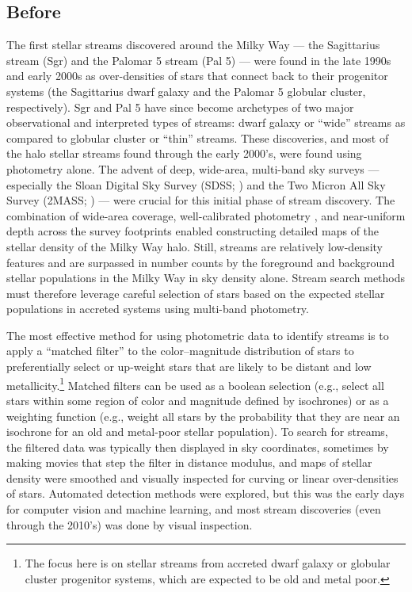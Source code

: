\documentclass[final,5p,times,twocolumn,authoryear]{elsarticle}
\begin{document}

\subsection{Before \gaia}

The first stellar streams discovered around the Milky Way --- the Sagittarius stream
(Sgr) and the Palomar 5 stream (Pal 5) --- were found in the late 1990s and early 2000s
as over-densities of stars that connect back to their progenitor systems (the
Sagittarius dwarf galaxy and the Palomar 5 globular cluster, respectively).
Sgr and Pal 5 have since become archetypes of two major observational and interpreted
types of streams: dwarf galaxy or ``wide'' streams as compared to globular cluster or
``thin'' streams.
These discoveries, and most of the halo stellar streams found through the early 2000's,
were found using photometry alone.
The advent of deep, wide-area, multi-band sky surveys --- especially the Sloan Digital
Sky Survey (SDSS; \citealt{york:2000, gunn:1998, fukugita:1996}) and the Two Micron All
Sky Survey (2MASS; \citealt{skrutskie:2006}) --- were crucial for this initial phase of
stream discovery.
The combination of wide-area coverage, well-calibrated photometry
\citep{padmanabhan:2008}, and near-uniform depth across the survey footprints enabled
constructing detailed maps of the stellar density of the Milky Way halo.
Still, streams are relatively low-density features and are surpassed in number counts by
the foreground and background stellar populations in the Milky Way in sky density alone.
Stream search methods must therefore leverage careful selection of stars based on the
expected stellar populations in accreted systems using multi-band photometry.

The most effective method for using photometric data to identify streams is to apply a
``matched filter'' \citep{rockosi:2002} to the color--magnitude distribution of stars
to preferentially select or up-weight stars that are likely to be distant and low
metallicity.\footnote{The focus here is on stellar streams from accreted dwarf galaxy or
globular cluster progenitor systems, which are expected to be old and metal poor.}
Matched filters can be used as a boolean selection (e.g., select all stars within some
region of color and magnitude defined by isochrones) or as a weighting function (e.g.,
weight all stars by the probability that they are near an isochrone for an old and
metal-poor stellar population).
To search for streams, the filtered data was typically then displayed in sky
coordinates, sometimes by making movies that step the filter in distance modulus, and
maps of stellar density were smoothed and visually inspected for curving or linear
over-densities of stars.
Automated detection methods were explored, but this was the early days for computer
vision and machine learning, and most stream discoveries (even through the 2010's) was
done by visual inspection.
\end{document}
